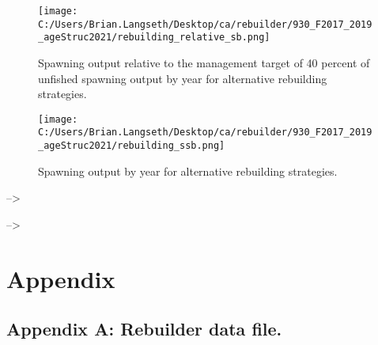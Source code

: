 \documentclass[11pt,
  english,
  a4paper,
]{article}
\begin{document}
\tagmcend\tagstructend


\begin{figure}
\centering
\texttt{[image: C:/Users/Brian.Langseth/Desktop/ca/rebuilder/930\_F2017\_2019\_ageStruc2021/rebuilding\_relative\_sb.png]}
\caption{Spawning output relative to the management target of 40 percent of unfished spawning output by year for alternative rebuilding strategies.\label{fig:rel-ssb-fig}}
\end{figure}

\tagmcend\tagstructend


\begin{figure}
\centering
\texttt{[image: C:/Users/Brian.Langseth/Desktop/ca/rebuilder/930\_F2017\_2019\_ageStruc2021/rebuilding\_ssb.png]}
\caption{Spawning output by year for alternative rebuilding strategies.\label{fig:ssb-fig}}
\end{figure}

\tagmcend\tagstructend


--\textgreater{}

\leavevmode\tagmcend\tagstructend\par


--\textgreater{}

\leavevmode\tagmcend\tagstructend\par

\clearpage


\hypertarget{appendix}{%
\section{Appendix}\label{appendix}}

\leavevmode\tagmcend\tagstructend


\hypertarget{append_a}{%
\subsection{Appendix A: Rebuilder data file.}\label{append_a}}
\end{document}
